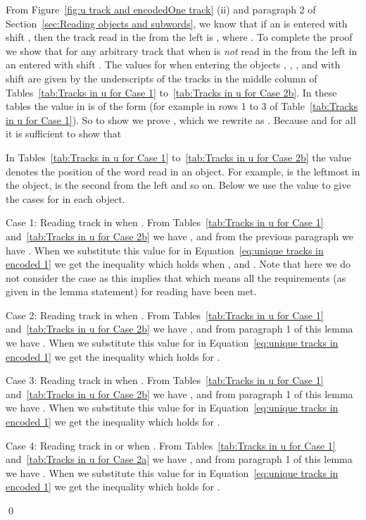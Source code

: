 \documentclass[11pt]{article} \usepackage{amsfonts,amsmath,amssymb,amsthm}
\renewenvironment{proof}{{\bfseries\noindent Proof.}}{\qed\vspace{3.5ex}}
\begin{document}
\begin{proof}
From Figure~\ref{fig:u track and encodedOne track} (ii) and paragraph 2 of Section~\ref{sec:Reading objects and  subwords}, we know that if an  is entered with shift , then the track read in the   from the left is , where . To complete the proof we show that for any arbitrary track  that  when  is \emph{not} read in the   from the left in an  entered with shift . 
The values for  when entering the objects , , , and  with shift  are given by the underscripts of the  tracks in the middle column of Tables~\ref{tab:Tracks in u for Case 1} to~\ref{tab:Tracks in u for Case 2b}. 
In these tables the value  in  is of the form  (for example  in rows 1 to 3 of Table~\ref{tab:Tracks in u for Case 1}). 
So to show  we prove , which we rewrite as . Because  and  for all   it is sufficient to show that 

In Tables~\ref{tab:Tracks in u for Case 1} to~\ref{tab:Tracks in u for Case 2b} the value  denotes the position of the  word read in an object. For example,  is the leftmost  in the object,  is the second  from the left and so on. Below we use the value  to give the cases for  in each object.

Case 1: Reading track  in  when . From Tables~\ref{tab:Tracks in u for Case 1} and~\ref{tab:Tracks in u for Case 2b} we have , and from the previous paragraph we have . When we substitute this value for  in Equation~\eqref{eq:unique tracks in encoded 1} we get the inequality  which holds when ,  and . Note that here we do not consider the case  as this implies that  which means all the requirements (as given in the lemma statement) for reading  have been met.

Case 2: Reading track  in  when . From Tables~\ref{tab:Tracks in u for Case 1} and~\ref{tab:Tracks in u for Case 2b} we have , and from paragraph 1 of this lemma we have . When we substitute this value for  in Equation~\eqref{eq:unique tracks in encoded 1} we get the inequality  which holds for .


Case 3: Reading track  in  when . From Tables~\ref{tab:Tracks in u for Case 1} and~\ref{tab:Tracks in u for Case 2b} we have , and from paragraph 1 of this lemma we have .  When we substitute this value for  in Equation~\eqref{eq:unique tracks in encoded 1} we get the inequality  which holds for .


Case 4: Reading track  in  or  when . From Tables~\ref{tab:Tracks in u for Case 1} and~\ref{tab:Tracks in u for Case 2a} we have , and from paragraph 1 of this lemma we have . When we substitute this value for  in Equation~\eqref{eq:unique tracks in encoded 1} we get the inequality  which holds for .



\end{proof}
\end{document}

